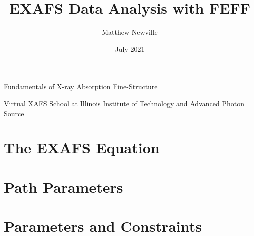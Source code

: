 \documentclass[9pt,aspectratio=1610]{beamer}
\begin{document}
\title[Virtual XAFS School]{EXAFS Data Analysis with FEFF}
\author[M Newville]{Matthew Newville}
\date{July-2021}


\begin{frame} \titlepage
  \vmm
  \begin{center}
    Fundamentals of X-ray Absorption Fine-Structure
  \end{center}

  \vmm

  \begin{cenpage}{60mm}
    Virtual XAFS School at Illinois Institute of Technology and Advanced
  Photon Source
\end{cenpage}
\end{frame}

\section{The EXAFS Equation}

 
 
 
 
 
\section{Path Parameters}
 
\section{Parameters and Constraints}
 
 


\end{document}
